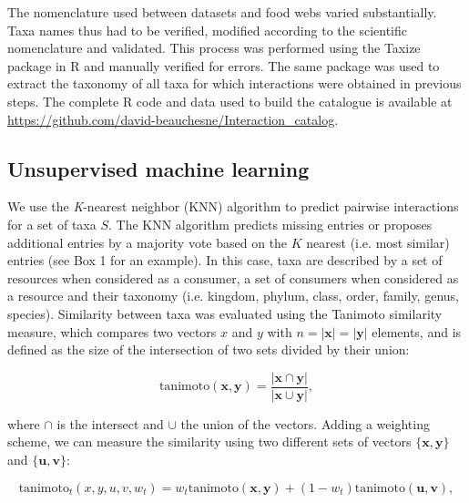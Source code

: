 \documentclass[letterpaper]{article}
\begin{document}
The nomenclature used between datasets and food webs varied substantially. Taxa names thus had to be verified, modified according to the scientific nomenclature and validated. This process was performed using the Taxize package in R \citep{Chamberlain2013, Chamberlain2014} and manually verified for errors. The same package was used to extract the taxonomy of all taxa for which interactions were obtained in previous steps. The complete R code and data used to build the catalogue is available at \href{https://github.com/david-beauchesne/Interaction_catalog}{https://github.com/david-beauchesne/Interaction\_catalog}.

\subsection{Unsupervised machine learning}
We use the \textit{K}-nearest neighbor (KNN) algorithm \citep{Murphy2012} to predict pairwise interactions for a set of taxa $S$. The KNN algorithm predicts missing entries or proposes additional entries by a majority vote based on the $K$ nearest (i.e. most similar) entries (see Box 1 for an example). In this case, taxa are described by a set of resources when considered as a consumer, a set of consumers when considered as a resource and their taxonomy (i.e. kingdom, phylum, class, order, family, genus, species). Similarity between taxa was evaluated using the Tanimoto similarity measure, which compares two vectors $x$ and $y$ with $n = \left\vert{\mathbf{x}}\right\vert = \left\vert{\mathbf{y}}\right\vert$ elements, and is defined as the size of the intersection of two sets divided by their union:

\begin{equation}
\mbox{tanimoto}(\mathbf{x}, \mathbf{y}) = \frac{\left\vert\mathbf{x} \cap \mathbf{y}\right\vert}{\left\vert\mathbf{x} \cup \mathbf{y}\right\vert},
\end{equation}

where \(\cap\) is the intersect and \(\cup\) the union of the vectors. Adding a weighting scheme, we can measure the similarity using two different sets of vectors \(\{\mathbf{x}, \mathbf{y}\}\) and \(\{\mathbf{u}, \mathbf{v}\}\):


\begin{equation}
\label{eq2}
\mbox{tanimoto}_t(x, y, u, v, w_t) = w_t\mbox{tanimoto}(\mathbf{x}, \mathbf{y}) + (1 - w_t)\mbox{tanimoto}(\mathbf{u}, \mathbf{v}),
\end{equation}
\end{document}
